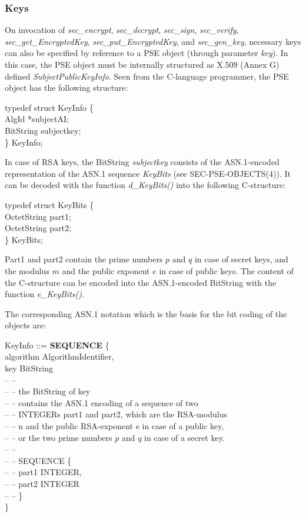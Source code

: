 \subsubsection{Keys}
On invocation of {\em sec\_encrypt}, {\em sec\_decrypt}, {\em sec\_sign}, {\em sec\_verify},
{\em sec\_get\_EncryptedKey}, {\em sec\_put\_EncryptedKey}, and {\em sec\_gen\_key}, necessary
keys can also be specified by reference to a PSE object (through parameter {\em key}). In this
case, the PSE object must be internally structured as X.509 (Annex G) defined
{\em SubjectPublicKeyInfo}. Seen from the C-language programmer, the PSE object 
has the following structure:
       
{\small
\bvtab
\4      typedef struct KeyInfo \{ \\
\6              AlgId \3        *subjectAI; \\
\6              BitString \3    subjectkey; \\
\4      \} KeyInfo;  \\
\evtab
}

In case of RSA keys, the BitString {\em subjectkey} consists of the ASN.1-encoded representation of the
ASN.1 sequence {\em KeyBits} (see SEC-PSE-OBJECTS(4)). 
It can be decoded with the function
{\em d\_KeyBits()} into the following C-structure:

{\small
\bvtab
\4      typedef struct KeyBits \{ \\
\6	        OctetString \4 part1; \\
\6      	OctetString \4 part2; \\
\4      \} KeyBits; \\
\evtab
}

Part1 and part2 contain the prime numbers $p$ and $q$ in case of secret keys, and the 
modulus $m$ and the public exponent $e$ in case of public keys. The content of the
C-structure can be encoded into the ASN.1-encoded BitString with the function
{\em e\_KeyBits()}.

The corresponding ASN.1 notation which is the basis for the bit coding of the objects are:

{\small
\bvtab
\1 KeyInfo ::= \3 {\bf SEQUENCE} \{  \\
\5 algorithm         \2 AlgorithmIdentifier,    \\
\5 key               \2 BitString            \\
\5 -- -- \\
\5 -- -- the BitString of key    \\
\5 -- -- contains the ASN.1 encoding of a sequence of two \\
\5 -- -- INTEGERs part1 and part2, which are the RSA-modulus    \\
\5 -- -- n and the public RSA-exponent e in case of a public key,    \\
\5 -- -- or the two prime numbers $p$ and $q$ in case of a secret key.    \\
\5 -- -- \\
\5 -- -- SEQUENCE \{ \\
\5 -- -- \2       part1 INTEGER,   \\
\5 -- -- \2       part2 INTEGER  \\
\5 -- -- \} \\
\4 \}
\evtab
}

